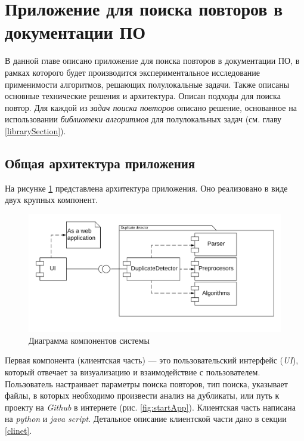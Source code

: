 \section{Приложение для поиска повторов в документации ПО}\label{searchPO}
В данной главе  описано приложение для поиска повторов в документации ПО, в рамках которого будет производится экспериментальное исследование применимости алгоритмов, решающих полулокальные задачи.
Также описаны  основные технические решения и архитектура.
Описан подходы для поиска повтор.
Для каждой из \emph{задач поиска повторов} описано решение, основанное на использовании \emph{библиотеки алгоритмов} для полулокальных задач (см. главу \ref{librarySection}).



\subsection{Общая архитектура приложения}
На рисунке \ref{fig:application} представлена архитектура приложения.
Оно реализовано в виде двух крупных компонент.

\begin{figure}[H]
    \includegraphics[width=\columnwidth]{figures/arhitecture.png}
    \caption{Диаграмма компонентов системы}\label{fig:application}
\end{figure}


Первая компонента (клиентская часть) --- это пользовательский интерфейс (\emph{UI}), который  отвечает за визуализацию и взаимодействие с пользователем.
Пользователь настраивает параметры поиска повторов, тип поиска, указывает файлы, в которых необходимо произвести анализ на дубликаты, или путь к проекту на \emph{Github} в интернете (рис. \ref{fig:startApp}).
Клиентская часть написана на \emph{python} и \emph{java script}.
Детальное описание клиентской части дано в секции \ref{clinet}.

